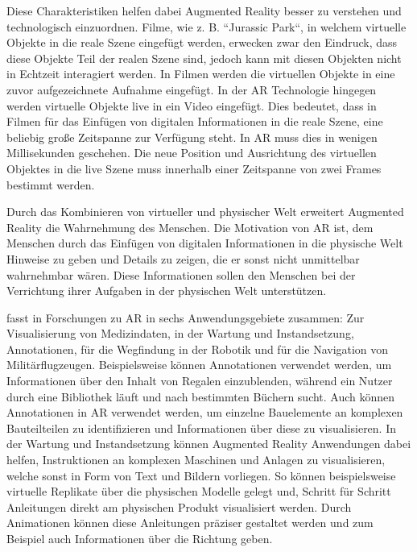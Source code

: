 Diese Charakteristiken helfen dabei Augmented Reality besser zu verstehen und technologisch einzuordnen. \cite{Azuma1997} Filme, wie z. B. ``Jurassic Park``, in welchem virtuelle Objekte in die reale Szene eingefügt werden, erwecken zwar den Eindruck, dass diese Objekte Teil der realen Szene sind, jedoch kann mit diesen Objekten nicht in Echtzeit interagiert werden. \cite{Tonnis2010} In Filmen werden die virtuellen Objekte in eine zuvor aufgezeichnete Aufnahme eingefügt. 
In der AR Technologie hingegen werden virtuelle Objekte live in ein Video eingefügt. Dies bedeutet, dass in  Filmen für das Einfügen von digitalen Informationen in die reale Szene, eine beliebig große Zeitspanne zur Verfügung steht. 
In AR muss dies in wenigen Millisekunden geschehen. Die neue Position und Ausrichtung des virtuellen Objektes in die live Szene muss innerhalb einer Zeitspanne von zwei Frames bestimmt werden.

Durch das Kombinieren von virtueller und physischer Welt erweitert Augmented Reality die Wahrnehmung des Menschen. Die Motivation von AR ist, dem Menschen durch das Einfügen
von digitalen Informationen in die physische Welt Hinweise zu geben und Details zu zeigen, die er sonst nicht unmittelbar wahrnehmbar wären. Diese Informationen sollen den Menschen 
bei der Verrichtung ihrer Aufgaben in der physischen Welt unterstützen.\cite{Azuma1997} 

\citeauthor{Azuma1997} fasst in \cite{Azuma1997} Forschungen zu AR in sechs Anwendungsgebiete zusammen: Zur Visualisierung von Medizindaten, in der Wartung 
und Instandsetzung, Annotationen, für die Wegfindung in der Robotik und für die Navigation von Militärflugzeugen. Beispielsweise können Annotationen 
verwendet werden, um Informationen über den Inhalt von Regalen einzublenden, während ein Nutzer durch eine Bibliothek läuft und nach bestimmten Büchern sucht.
Auch können Annotationen in AR verwendet werden, um einzelne Bauelemente an komplexen Bauteilteilen zu identifizieren und Informationen über diese zu visualisieren. 
In der Wartung und Instandsetzung können Augmented Reality Anwendungen dabei helfen, Instruktionen an komplexen Maschinen und Anlagen zu visualisieren, welche sonst in 
Form von Text und Bildern vorliegen. So können beispielsweise virtuelle Replikate über die physischen Modelle gelegt und, Schritt für Schritt Anleitungen direkt am physischen Produkt visualisiert werden. 
Durch Animationen können diese Anleitungen präziser gestaltet werden und zum Beispiel auch Informationen über die Richtung geben. \cite{Azuma1997} 

